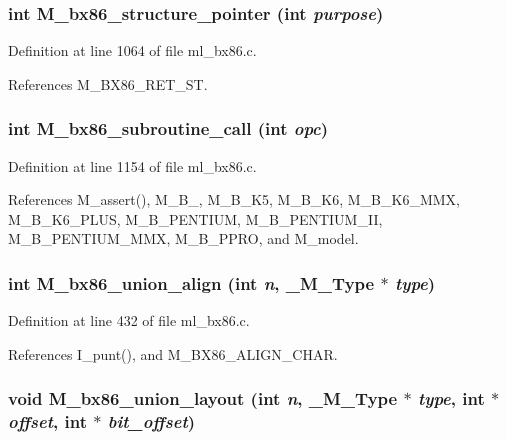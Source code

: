 \subsubsection{\setlength{\rightskip}{0pt plus 5cm}int M\_\-bx86\_\-structure\_\-pointer (int {\em purpose})}\label{ml__bx86_8c_1143f1cb9d965e619b8efb827b0ac9f7}




Definition at line 1064 of file ml\_\-bx86.c.

References M\_\-BX86\_\-RET\_\-ST.
\subsubsection{\setlength{\rightskip}{0pt plus 5cm}int M\_\-bx86\_\-subroutine\_\-call (int {\em opc})}\label{ml__bx86_8c_ed0763221ce8b928fded67eb4bbe86ac}




Definition at line 1154 of file ml\_\-bx86.c.

References M\_\-assert(), M\_\-B\_, M\_\-B\_\-K5, M\_\-B\_\-K6, M\_\-B\_\-K6\_\-MMX, M\_\-B\_\-K6\_\-PLUS, M\_\-B\_\-PENTIUM, M\_\-B\_\-PENTIUM\_\-II, M\_\-B\_\-PENTIUM\_\-MMX, M\_\-B\_\-PPRO, and M\_\-model.
\subsubsection{\setlength{\rightskip}{0pt plus 5cm}int M\_\-bx86\_\-union\_\-align (int {\em n}, \bf{\_\-M\_\-Type} $\ast$ {\em type})}\label{ml__bx86_8c_b064c822a6369d1368f976c10c979b18}




Definition at line 432 of file ml\_\-bx86.c.

References I\_\-punt(), and M\_\-BX86\_\-ALIGN\_\-CHAR.
\subsubsection{\setlength{\rightskip}{0pt plus 5cm}void M\_\-bx86\_\-union\_\-layout (int {\em n}, \bf{\_\-M\_\-Type} $\ast$ {\em type}, int $\ast$ {\em offset}, int $\ast$ {\em bit\_\-offset})}\label{ml__bx86_8c_ab14e501b9aa492a29bc15baf1196b57}




